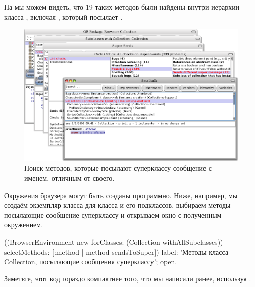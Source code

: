 \documentclass[a4paper,10pt,twoside]{book}
\begin{document}
На  мы можем видеть, что 19 таких методов были найдены внутри иерархии класса , включая , который посылает .
\begin{figure}[ht]\centering
	\includegraphics[width=\linewidth]{sendDifferentSuper}
	\caption{Поиск методов, которые посылают суперклассу сообщение с именем, отличным от своего.}
\end{figure}

Окружения браузера могут быть созданы программно.
Ниже, например, мы создаём экземпляр класса  для класса  и его подклассов, выбираем методы посылающие сообщение суперклассу и открываем окно с полученным окружением.
\begin{code}{}
((BrowserEnvironment new forClasses: (Collection withAllSubclasses))
	selectMethods: [:method | method sendsToSuper])
	label: 'Методы класса Collection, посылающие сообщения суперклассу';
	open.
\end{code}{}

Заметьте, этот код гораздо компактнее того, что мы написали ранее, используя .
\end{document}
